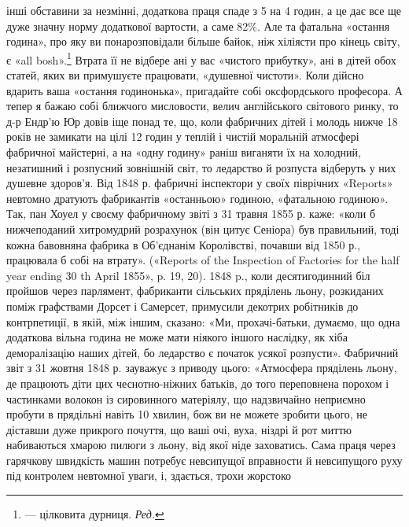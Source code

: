 інші обставини за незмінні,
додаткова праця спаде з 5 на 4 годин, а це дає все ще дуже значну норму додаткової вартости,
а саме 82\%. Але та фатальна «остання година», про яку ви понарозповідали більше байок, ніж
хіліясти про кінець світу, є «all bosh».\footnote*{
— цілковита дурниця. \emph{Ред.}
} Втрата її не відбере ані у вас «чистого прибутку», ані в
дітей обох статей, яких ви примушуєте працювати, «душевної чистоти».
Коли дійсно вдарить ваша «остання годинонька», пригадайте собі оксфордського професора. А тепер я
бажаю собі ближчого мисловости, велич англійського світового ринку, то д-р Ендр’ю Юр довів іще понад
те, що, коли фабричних дітей і молодь нижче 18 років не замикати
на цілі 12 годин у теплій і чистій моральній атмосфері фабричної майстерні, а на «одну годину» раніш
виганяти їх на холодний, незатишний і розпусний зовнішній світ, то ледарство й розпуста відберуть у
них душевне здоров’я. Від 1848 р. фабричні інспектори у своїх піврічних «Reports»
невтомно дратують фабрикантів «останньою» годиною, «фатальною
годиною». Так, пан Хоуел у своєму фабричному звіті з 31 травня 1855 р.
каже: «коли б нижчеподаний хитромудрий розрахунок (він цитує Сеніора) був правильний, тоді кожна
бавовняна фабрика в Об’єднанім Королівстві, почавши від 1850 р., працювала б собі на втрату».
(«Reports of
the Inspection of Factories for the half year ending 30 th April 1855», p. 19, 20). 1848 p., коли
десятигодинний біл пройшов через парлямент, фабриканти сільських пряділень льону, розкиданих поміж
графствами Дорсет і Самерсет, примусили декотрих робітників до контрпетиції, в якій, між іншим,
сказано: «Ми, прохачі-батьки, думаємо, що одна додаткова
вільна година не може мати ніякого іншого наслідку, як хіба деморалізацію наших дітей, бо ледарство
є початок усякої розпусти». Фабричний звіт з 31 жовтня 1848 р. зауважує з приводу цього: «Атмосфера
пряділень льону, де працюють діти цих чеснотно-ніжних батьків, до того переповнена порохом і
частинками волокон із сировинного матеріялу, що
надзвичайно неприємно пробути в прядільні навіть 10 хвилин, бож ви не
можете зробити цього, не діставши дуже прикрого почуття, що ваші очі, вуха, ніздрі й рот миттю
набиваються хмарою пилюги з льону, від якої ніде заховатись. Сама праця через гарячкову швидкість
машин потребує
невсипущої вправности й невсипущого руху під контролем невтомної уваги, і, здається, трохи жорстоко
